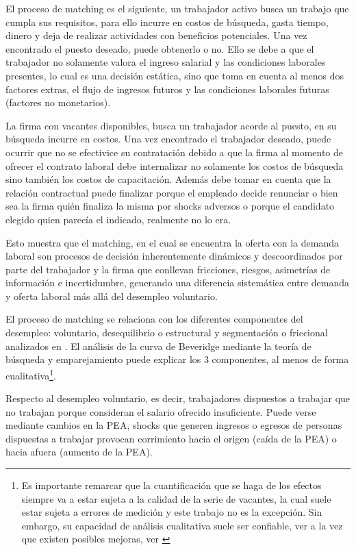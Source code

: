 \documentclass[msc,oneside,a4paper]{udelar} %
\begin{document}
  El proceso de matching es el siguiente, un trabajador activo busca un trabajo que cumpla sus requisitos, para ello incurre en costos de búsqueda, gasta tiempo, dinero y deja de realizar actividades con beneficios potenciales. Una vez encontrado el puesto deseado, puede obtenerlo o no. Ello se debe a que el trabajador no solamente valora el ingreso salarial y las condiciones laborales presentes, lo cual es una decisión estática, sino que toma en cuenta al menos dos factores extras, el flujo de ingresos futuros y las condiciones laborales futuras (factores no monetarios).
  
  La firma con vacantes disponibles, busca un trabajador acorde al puesto, en su búsqueda incurre en costos. Una vez encontrado el trabajador deseado, puede ocurrir que no se efectivice su contratación debido a que la firma al momento de ofrecer el contrato laboral debe internalizar no solamente los costos de búsqueda sino también los costos de capacitación. Además debe tomar en cuenta que la relación contractual puede finalizar porque el empleado decide renunciar o bien sea la firma quién finaliza la misma por shocks adversos o porque el candidato elegido quien parecía el indicado, realmente no lo era.
  
  Esto muestra que el matching, en el cual se encuentra la oferta con la demanda laboral son procesos de decisión inherentemente dinámicos y descoordinados por parte del trabajador y la firma que conllevan fricciones, riesgos, asimetrías de información e incertidumbre, generando una diferencia sistemática entre demanda y oferta laboral más allá del desempleo voluntario.
  
  El proceso de matching se relaciona con los diferentes componentes del desempleo: voluntario, desequilibrio o estructural y segmentación o friccional analizados en \cite{Rama1988}.
  El análisis de la curva de Beveridge mediante la teoría de búsqueda y emparejamiento puede explicar los 3 componentes, al menos de forma cualitativa\footnote{Es importante remarcar que la cuantificación que se haga de los efectos siempre va a estar sujeta a la calidad de la serie de vacantes, la cual suele estar sujeta a errores de medición y este trabajo no es la excepción. Sin embargo, su capacidad de análisis cualitativa suele ser confiable, ver \cite{Dicks-Mireaux1958} a la vez que existen posibles mejoras, ver \cite{Abraham1987}}.
  
  Respecto al desempleo voluntario, es decir, trabajadores dispuestos a trabajar que no trabajan porque consideran el salario ofrecido insuficiente. Puede verse mediante cambios en la PEA, shocks que generen ingresos o egresos de personas dispuestas a trabajar provocan corrimiento hacia el origen (caída de la PEA) o hacia afuera (aumento de la PEA).
  
\end{document}
